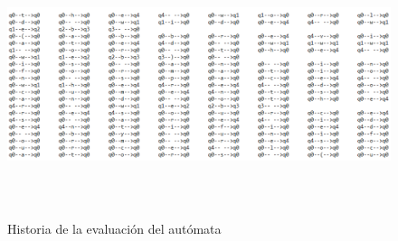 \begin{figure}[H]
\includegraphics[width=\textwidth, height=7cm]{HistoriaWebayA.png}
\label{fig:manualnuevoconteo_alfabeto}
\caption{Historia de la evaluaci\'on del aut\'omata}
\end{figure}


\newpage

